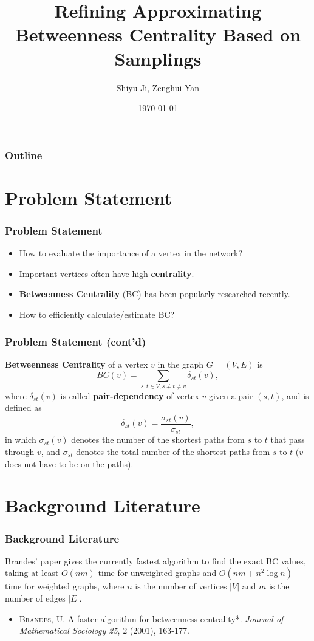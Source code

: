 \documentclass[12pt]{beamer}
\begin{document}
\title{Refining Approximating Betweenness Centrality Based on Samplings}
\author{Shiyu Ji, Zenghui Yan}
\date{\today}

\begin{frame}
	\titlepage
\end{frame}

\begin{frame}
	\frametitle{Outline}
	\begin{small}
	\tableofcontents%
	\end{small}
\end{frame}

\section{Problem Statement}
\begin{frame}
	\frametitle{Problem Statement}
	\begin{itemize}
		\item How to evaluate the importance of a vertex in the network?
		\item Important vertices often have high {\bf centrality}.
		\item {\bf Betweenness Centrality} (BC) has been popularly researched recently.
		\item How to efficiently calculate/estimate BC?
	\end{itemize}
\end{frame}

\begin{frame}
	\frametitle{Problem Statement (cont'd)}
	
	{\bf Betweenness Centrality} of a vertex $v$ in the graph $G=(V,E)$ is
	$$
	BC(v) = \sum_{s,t\in V, s\not=t\not=v} \delta_{st}(v),
	$$
	where $\delta_{st}(v)$ is called {\bf pair-dependency} of vertex $v$ given a pair $(s,t)$, and is defined as
	$$
	\delta_{st}(v) = \frac{\sigma_{st}(v)}{\sigma_{st}},
	$$
	in which $\sigma_{st}(v)$ denotes the number of the shortest paths from $s$ to $t$ that pass through $v$, and $\sigma_{st}$ denotes the total number of the shortest paths from $s$ to $t$ ($v$ does not have to be on the paths).
\end{frame}

\section{Background Literature}
\begin{frame}
	\frametitle{Background Literature}
	Brandes' paper gives the currently fastest algorithm to find the exact BC values, taking at least $O(nm)$ time for unweighted graphs and $O(nm + n^2 \log n)$ time for weighted graphs, where $n$ is the number of vertices $|V|$ and $m$ is the number of edges $|E|$.
	
	\begin{itemize}
		\item \textsc{Brandes, U}. A faster algorithm for betweenness centrality*. {\it Journal of Mathematical Sociology 25}, 2 (2001), 163-177.
	\end{itemize}
\end{frame}
\end{document}
